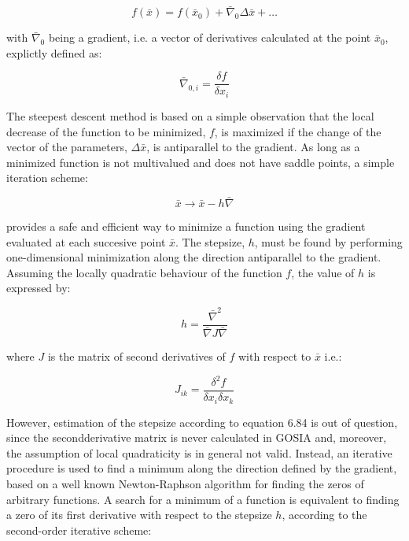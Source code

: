 \documentclass[10pt]{article}
\begin{document}
\begin{equation*}
f(\bar{x})=f\left(\bar{x}_{0}\right)+\bar{\nabla}_{0} \Delta \bar{x}+\ldots \tag{6.85}
\end{equation*}


with $\bar{\nabla}_{0}$ being a gradient, i.e. a vector of derivatives calculated at the point $\bar{x}_{0}$, explictly defined as:


\begin{equation*}
\bar{\nabla}_{0, i}=\frac{\delta f}{\delta x_{i}} \tag{6.86}
\end{equation*}


The steepest descent method is based on a simple observation that the local decrease of the function to be minimized, $f$, is maximized if the change of the vector of the parameters, $\Delta \bar{x}$, is antiparallel to the gradient. As long as a minimized function is not multivalued and does not have saddle points, a simple iteration scheme:


\begin{equation*}
\bar{x} \rightarrow \bar{x}-h \bar{\nabla} \tag{6.87}
\end{equation*}


provides a safe and efficient way to minimize a function using the gradient evaluated at each succesive point $\bar{x}$. The stepsize, $h$, must be found by performing one-dimensional minimization along the direction antiparallel to the gradient. Assuming the locally quadratic behaviour of the function $f$, the value of $h$ is expressed by:


\begin{equation*}
h=\frac{\bar{\nabla}^{2}}{\bar{\nabla} J \bar{\nabla}} \tag{6.88}
\end{equation*}


where $J$ is the matrix of second derivatives of $f$ with respect to $\bar{x}$ i.e.:


\begin{equation*}
J_{i k}=\frac{\delta^{2} f}{\delta x_{i} \delta x_{k}} \tag{6.89}
\end{equation*}


However, estimation of the stepsize according to equation 6.84 is out of question, since the secondderivative matrix is never calculated in GOSIA and, moreover, the assumption of local quadraticity is in general not valid. Instead, an iterative procedure is used to find a minimum along the direction defined by the gradient, based on a well known Newton-Raphson algorithm for finding the zeros of arbitrary functions. A search for a minimum of a function is equivalent to finding a zero of its first derivative with respect to the stepsize $h$, according to the second-order iterative scheme:
\end{document}
